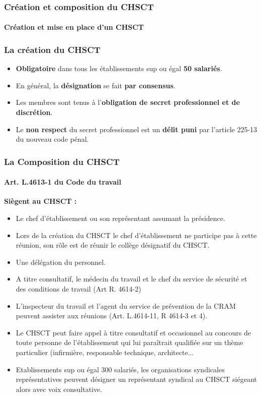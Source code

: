 \documentclass{beamer}
\begin{document}
\begin{frame}
\frametitle{Création et composition du CHSCT}
\framesubtitle{Création et mise en place d'un CHSCT}
\end{frame}

\begin{frame}
\frametitle{La création du CHSCT}

\begin{itemize}
\item \textbf{Obligatoire} dans tous les établissements sup ou égal \textbf{50 salariés}.

\item En général, la \textbf{désignation} se fait \textbf{par consensus}.

\item Les membres sont tenus à l'\textbf{obligation de secret professionnel et de discrétion}.

\item Le \textbf{non respect} du secret professionnel est un \textbf{délit puni} par l’article 225-13 du nouveau code pénal.
\end{itemize}
\end{frame}

\begin{frame}
\frametitle{La Composition du CHSCT}
\framesubtitle{Art. L.4613-1 du Code du travail}

\textbf{Siègent au CHSCT :}

\begin{itemize}
        \item  Le chef d'établissement ou son représentant assumant la présidence.

\item Lors de la création du CHSCT le chef d’établissement ne participe pas à cette réunion, son rôle est de réunir le collège désignatif du CHSCT.

\item Une délégation du personnel.

\item A titre consultatif, le médecin du travail et le chef du service de sécurité et des conditions de travail (Art R. 4614-2)
  
\item L'inspecteur du travail et l'agent du service de prévention de la CRAM peuvent assister aux réunions (Art. L.4614-11, R 4614-3 et 4). 

\item Le CHSCT peut faire appel à titre consultatif et occasionnel au concours de toute personne de l'établissement qui lui paraîtrait qualifiée sur un thème particulier (infirmière, responsable technique, architecte...

\item Etablissements sup ou égal 300 salariés, les organisations syndicales représentatives peuvent désigner un représentant syndical au CHSCT siégeant alors avec voix consultative.
\end{itemize}
\end{frame}
\end{document}
